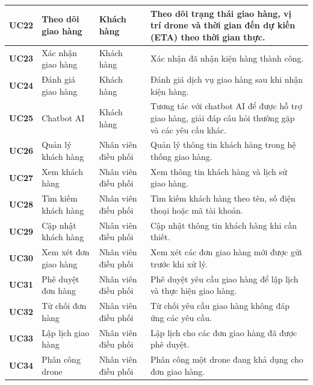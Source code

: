 \begin{longtable}{|p{1.2cm}|p{3.5cm}|p{2.8cm}|p{6.5cm}|}
\textbf{UC22} & Theo dõi giao hàng & Khách hàng &
Theo dõi trạng thái giao hàng, vị trí drone và thời gian đến dự kiến (ETA) theo thời gian thực. \\
\hline

\textbf{UC23} & Xác nhận giao hàng & Khách hàng &
Xác nhận đã nhận kiện hàng thành công. \\
\hline

\textbf{UC24} & Đánh giá giao hàng & Khách hàng &
Đánh giá dịch vụ giao hàng sau khi nhận kiện hàng. \\
\hline

\textbf{UC25} & Chatbot AI & Khách hàng &
Tương tác với chatbot AI để được hỗ trợ giao hàng, giải đáp câu hỏi thường gặp và các yêu cầu khác. \\
\hline

\textbf{UC26} & Quản lý khách hàng & Nhân viên điều phối &
Quản lý thông tin khách hàng trong hệ thống giao hàng. \\
\hline

\textbf{UC27} & Xem khách hàng & Nhân viên điều phối &
Xem thông tin khách hàng và lịch sử giao hàng. \\
\hline

\textbf{UC28} & Tìm kiếm khách hàng & Nhân viên điều phối &
Tìm kiếm khách hàng theo tên, số điện thoại hoặc mã tài khoản. \\
\hline

\textbf{UC29} & Cập nhật khách hàng & Nhân viên điều phối &
Cập nhật thông tin khách hàng khi cần thiết. \\
\hline

\textbf{UC30} & Xem xét đơn giao hàng & Nhân viên điều phối &
Xem xét các đơn giao hàng mới được gửi trước khi xử lý. \\
\hline

\textbf{UC31} & Phê duyệt đơn hàng & Nhân viên điều phối &
Phê duyệt yêu cầu giao hàng để lập lịch và thực hiện giao hàng. \\
\hline

\textbf{UC32} & Từ chối đơn hàng & Nhân viên điều phối &
Từ chối yêu cầu giao hàng không đáp ứng các yêu cầu. \\
\hline

\textbf{UC33} & Lập lịch giao hàng & Nhân viên điều phối &
Lập lịch cho các đơn giao hàng đã được phê duyệt. \\
\hline

\textbf{UC34} & Phân công drone & Nhân viên điều phối &
Phân công một drone đang khả dụng cho đơn giao hàng. \\
\hline


\end{longtable}
